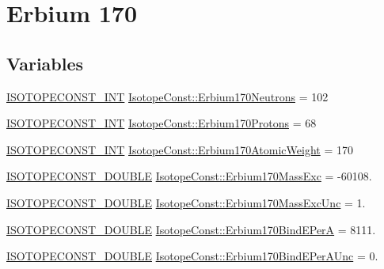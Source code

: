 \hypertarget{group___isotope_const-_erbium-_er170}{}\section{Erbium 170}
\label{group___isotope_const-_erbium-_er170}
\subsection*{Variables}
\begin{DoxyCompactItemize}
\item 
\mbox{\hyperlink{group___isotope_const-_macros_ga5f18360b3e99483a35c32d789e62621c}{I\+S\+O\+T\+O\+P\+E\+C\+O\+N\+S\+T\+\_\+\+I\+NT}} \mbox{\hyperlink{group___isotope_const-_erbium-_er170_ga5ac7786df74f7d9f96e13cac8c09624d}{Isotope\+Const\+::\+Erbium170\+Neutrons}} = 102
\item 
\mbox{\hyperlink{group___isotope_const-_macros_ga5f18360b3e99483a35c32d789e62621c}{I\+S\+O\+T\+O\+P\+E\+C\+O\+N\+S\+T\+\_\+\+I\+NT}} \mbox{\hyperlink{group___isotope_const-_erbium-_er170_ga54dd97d0042da25db74f39cc7d37262c}{Isotope\+Const\+::\+Erbium170\+Protons}} = 68
\item 
\mbox{\hyperlink{group___isotope_const-_macros_ga5f18360b3e99483a35c32d789e62621c}{I\+S\+O\+T\+O\+P\+E\+C\+O\+N\+S\+T\+\_\+\+I\+NT}} \mbox{\hyperlink{group___isotope_const-_erbium-_er170_ga4c86c5c084030fb0f44508ccb1d903e2}{Isotope\+Const\+::\+Erbium170\+Atomic\+Weight}} = 170
\item 
\mbox{\hyperlink{group___isotope_const-_macros_ga8f45a7272ce02c0b4c65c44636ed719a}{I\+S\+O\+T\+O\+P\+E\+C\+O\+N\+S\+T\+\_\+\+D\+O\+U\+B\+LE}} \mbox{\hyperlink{group___isotope_const-_erbium-_er170_ga80c5bb868f56088490337af7cf3661b8}{Isotope\+Const\+::\+Erbium170\+Mass\+Exc}} = -\/60108.
\item 
\mbox{\hyperlink{group___isotope_const-_macros_ga8f45a7272ce02c0b4c65c44636ed719a}{I\+S\+O\+T\+O\+P\+E\+C\+O\+N\+S\+T\+\_\+\+D\+O\+U\+B\+LE}} \mbox{\hyperlink{group___isotope_const-_erbium-_er170_gae41c9c5c6ecf383bf13cd29dd4efbe7e}{Isotope\+Const\+::\+Erbium170\+Mass\+Exc\+Unc}} = 1.
\item 
\mbox{\hyperlink{group___isotope_const-_macros_ga8f45a7272ce02c0b4c65c44636ed719a}{I\+S\+O\+T\+O\+P\+E\+C\+O\+N\+S\+T\+\_\+\+D\+O\+U\+B\+LE}} \mbox{\hyperlink{group___isotope_const-_erbium-_er170_gaa0bd42e7585baafdb14a16d3166e619a}{Isotope\+Const\+::\+Erbium170\+Bind\+E\+PerA}} = 8111.
\item 
\mbox{\hyperlink{group___isotope_const-_macros_ga8f45a7272ce02c0b4c65c44636ed719a}{I\+S\+O\+T\+O\+P\+E\+C\+O\+N\+S\+T\+\_\+\+D\+O\+U\+B\+LE}} \mbox{\hyperlink{group___isotope_const-_erbium-_er170_ga99d30ab586c6f74b0a74fec64c7a07b5}{Isotope\+Const\+::\+Erbium170\+Bind\+E\+Per\+A\+Unc}} = 0.

\end{DoxyCompactItemize}
